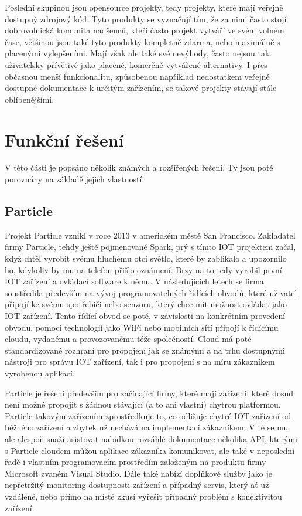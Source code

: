 Poslední skupinou jsou opensource projekty, tedy projekty, které mají veřejně dostupný zdrojový kód. Tyto produkty se vyznačují tím, že za nimi často stojí dobrovolnická komunita nadšenců, kteří často projekt vytváří ve svém volném čase, většinou jsou také tyto produkty kompletně zdarma, nebo maximálně s placenými vylepšeními. Mají však ale také své nevýhody, často nejsou tak uživatelsky přívětivé jako placené, komerčně vytvářené alternativy. I přes občasnou menší funkcionalitu, způsobenou například nedostatkem veřejně dostupné dokumentace k určitým zařízením, se takové projekty stávají stále oblíbenějšími.

\section{Funkční řešení}

V této části je popsáno několik známých a rozšířených řešení. Ty jsou poté porovnány na základě jejich vlastností.

\subsection{Particle}

Projekt Particle vznikl v roce 2013 v americkém městě San Francisco. Zakladatel firmy Particle, tehdy ještě pojmenované Spark, prý s tímto IOT projektem začal, když chtěl vyrobit svému hluchému otci světlo, které by zablikalo a upozornilo ho, kdykoliv by mu na telefon přišlo oznámení. Brzy na to tedy vyrobil první IOT zařízení a ovládací software k němu. V následujících letech se firma soustředila především na vývoj programovatelných řídících obvodů, které uživatel připojí ke svému spotřebiči nebo senzoru, který chce mít možnost ovládat jako IOT zařízení. Tento řídící obvod se poté, v závislosti na konkrétním provedení obvodu, pomocí technologií jako WiFi nebo mobilních sítí připojí k řídícímu cloudu, vydanému a provozovanému téže společností. Cloud má poté standardizované rozhraní pro propojení jak se známými a na trhu dostupnými nástroji pro správu IOT zařízení, tak i pro propojení s na míru zákazníkem vyrobenou aplikací. 

Particle je řešení především pro začínající firmy, které mají zařízení, které dosud není možné propojit s žádnou stávající (a to ani vlastní) chytrou platformou. Particle takovým zařízením zprostředkuje to, co odlišuje chytré IOT zařízení od běžného zařízení a zbytek už nechává na implementaci zákazníkem. V té se mu ale alespoň snaží asistovat nabídkou rozsáhlé dokumentace několika API, kterými s Particle cloudem můžou aplikace zákazníka komunikovat, ale také v neposlední řadě i vlastním programovacím prostředím založeným na produktu firmy Microsoft zvaném Visual Studio. Dále také nabízí doplňkové služby jako je nepřetržitý monitoring dostupnosti zařízení a případný servis, který ať už vzdáleně, nebo přímo na místě zkusí vyřešit případný problém s konektivitou zařízení.

